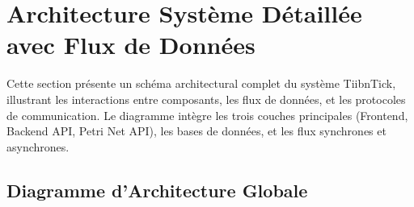 \section{Architecture Système Détaillée avec Flux de Données}

Cette section présente un schéma architectural complet du système TiibnTick, illustrant les interactions entre composants, les flux de données, et les protocoles de communication. Le diagramme intègre les trois couches principales (Frontend, Backend API, Petri Net API), les bases de données, et les flux synchrones et asynchrones.

\subsection{Diagramme d'Architecture Globale}

